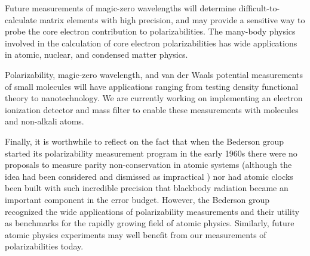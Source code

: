 Future measurements of magic-zero wavelengths will determine difficult-to-calculate matrix elements with high precision, and may provide a sensitive way to probe the core electron contribution to polarizabilities. The many-body physics involved in the calculation of core electron polarizabilities has wide applications in atomic, nuclear, and condensed matter physics.

Polarizability, magic-zero wavelength, and van der Waals potential measurements of small molecules will have applications ranging from testing density functional theory to nanotechnology. We are currently working on implementing an electron ionization detector and mass filter to enable these measurements with molecules and non-alkali atoms.

Finally, it is worthwhile to reflect on the fact that when the Bederson group started its polarizability measurement program in the early 1960s there were no proposals to measure parity non-conservation in atomic systems (although the idea had been considered and dismissed as impractical \cite{Der07}) nor had atomic clocks been built with such incredible precision that blackbody radiation became an important component in the error budget. However, the Bederson group recognized the wide applications of polarizability measurements and their utility as benchmarks for the rapidly growing field of atomic physics. Similarly, future atomic physics experiments may well benefit from our measurements of polarizabilities today.


